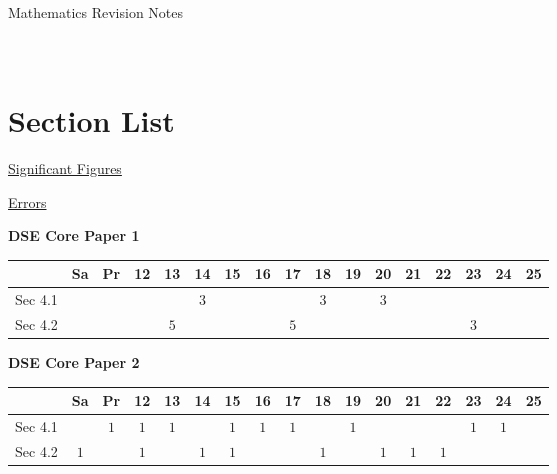 \documentclass[12pt, a4paper]{article}
\begin{document}
\newpage
\newpage
\thispagestyle{empty}
\begin{center}
Mathematics Revision Notes\\\vspace{1cm}
\\\vspace{1cm}
{\fontsize{24pt}{24pt}\selectfont {Approximation and Errors}} \\\vspace{1cm}
\label{chapter:S2-4}

\end{center}
\vspace{0.5cm}
\hline
\section*{Section List}
\begin{enumx}[label=Sec 4.\arabic*\ ]
\item \hyperref[section:2-4-1]{Significant Figures}
\item \hyperref[section:2-4-2]{Errors}
\end{enumx}
\begin{absolutelynopagebreak}
\begin{center}
\textbf{DSE Core Paper 1}
\end{center}
\begin{center}
\begin{tabular}{|l|c|c|c|c|c|c|c|c|c|c|c|c|c|c|c|c|}
\hline
        & Sa & Pr & 12 & 13 & 14 & 15 & 16 & 17 & 18 & 19 & 20 & 21 & 22 & 23 & 24 & 25 \\\hline\hline
Sec 4.1 &  &  &  &  &  $3$ &  &  &  &  $3$ &  &  $3$ &  &  &  &  &  \\\hline
Sec 4.2 &  &  &  &  $5$ &  &  &  &  $5$ &  &  &  &  &  &  $3$ &  &  \\\hline
\end{tabular}
\end{center}
\end{absolutelynopagebreak}
\begin{absolutelynopagebreak}
\begin{center}
\textbf{DSE Core Paper 2}
\end{center}
\begin{center}
\begin{tabular}{|l|c|c|c|c|c|c|c|c|c|c|c|c|c|c|c|c|}
\hline
        & Sa & Pr & 12 & 13 & 14 & 15 & 16 & 17 & 18 & 19 & 20 & 21 & 22 & 23 & 24 & 25 \\\hline\hline
Sec 4.1 &  &  $1$ &  $1$ &  $1$ &  &  $1$ &  $1$ &  $1$ &  &  $1$ &  &  &  &  $1$ &  $1$ &  \\\hline
Sec 4.2 &  $1$ &  &  $1$ &  &  $1$ &  $1$ &  &  &  $1$ &  &  $1$ &  $1$ &  $1$ &  &  &  \\\hline
\end{tabular}
\end{center}
\end{absolutelynopagebreak}
\end{document}
